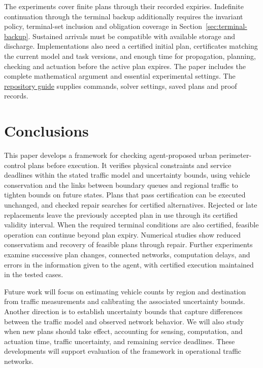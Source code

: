 \documentclass[preprint,12pt]{elsarticle}
\newcommand{\reproductiondetails}[1]{\href{https://github.com/AlienEslami/agentic-perimeter-runtime-certification/blob/main/paper/supporting_materials/REPRODUCING_THE_REDUCED_PAPER.md}{#1}}
\begin{document}
The experiments cover finite plans through their recorded expiries.
Indefinite continuation through the terminal backup additionally requires
the invariant policy, terminal-set inclusion and obligation coverage in
Section~\ref{sec:terminal-backup}. Sustained arrivals must be compatible
with available storage and discharge. Implementations also need a certified
initial plan, certificates matching the current model and task versions,
and enough time for propagation, planning, checking and actuation before
the active plan expires. The paper includes the complete mathematical
argument and essential experimental settings. The
\reproductiondetails{repository guide} supplies commands, solver settings,
saved plans and proof records.

\section{Conclusions}
\label{sec:new-conclusion}

This paper develops a framework for checking agent-proposed urban
perimeter-control plans before execution. It verifies physical constraints
and service deadlines within the stated traffic model and uncertainty
bounds, using vehicle conservation and the links between boundary queues and
regional traffic to tighten bounds on future states. Plans that pass
certification can be executed unchanged, and checked repair searches for
certified alternatives. Rejected or late replacements leave the previously
accepted plan in use through its certified validity interval. When the
required terminal conditions are also certified, feasible operation can
continue beyond plan expiry. Numerical studies show reduced conservatism and
recovery of feasible plans through repair. Further experiments examine
successive plan changes, connected networks, computation delays, and errors
in the information given to the agent, with certified execution maintained
in the tested cases.

Future work will focus on estimating vehicle counts by region and
destination from traffic measurements and calibrating the associated
uncertainty bounds. Another direction is to establish uncertainty bounds
that capture differences between the traffic model and observed network
behavior. We will also study when new plans should take effect, accounting
for sensing, computation, and actuation time, traffic uncertainty, and
remaining service deadlines. These developments will support evaluation of
the framework in operational traffic networks.
\end{document}
